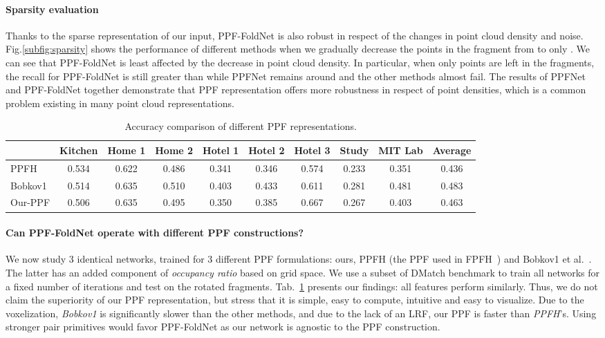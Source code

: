 \paragraph{Sparsity evaluation}
Thanks to the sparse representation of our input, PPF-FoldNet is also robust in respect of the changes in point cloud density and noise. Fig.\ref{subfig:sparsity} shows the performance of different methods when we gradually decrease the points in the fragment from  to only . We can see that PPF-FoldNet is least affected by the decrease in point cloud density. In particular, when only  points are left in the fragments, the recall for PPF-FoldNet is still greater than  while PPFNet remains around  and the other methods almost fail. The results of PPFNet and PPF-FoldNet together demonstrate that PPF representation offers more robustness in respect of point densities, which is a common problem existing in many point cloud representations.    
\begin{table}[t!]
  \centering
  \setlength{\tabcolsep}{3pt}
  \caption{Accuracy comparison of different PPF representations.}
    \begin{tabular}{lccccccccc}
          & \multicolumn{1}{l}{Kitchen} & \multicolumn{1}{l}{Home 1} & \multicolumn{1}{l}{Home 2} & \multicolumn{1}{l}{Hotel 1} & \multicolumn{1}{l}{Hotel 2} & \multicolumn{1}{l}{Hotel 3} & \multicolumn{1}{l}{Study} & \multicolumn{1}{l}{MIT Lab} & \multicolumn{1}{l}{Average} \\
    \midrule
    PPFH  & 0.534 & 0.622 & 0.486 & 0.341 & 0.346 & 0.574 & 0.233 & 0.351 & 0.436 \\
     Bobkov1     & 0.514 & 0.635 & 0.510 & 0.403 & 0.433 & 0.611 & 0.281 & 0.481 & 0.483 \\
    Our-PPF & 0.506 & 0.635 & 0.495 & 0.350 & 0.385 & 0.667 & 0.267 & 0.403 & 0.463 \\
    \end{tabular}\label{tab:ppf}\end{table}\paragraph{Can PPF-FoldNet operate with different PPF constructions?} We now study 3 identical networks, trained for 3 different PPF formulations: ours, PPFH (the PPF used in FPFH~\cite{fpfh}) and Bobkov1 et al.~\cite{bobkov2018noise}. The latter has an added component of \textit{occupancy ratio} based on grid space. We use a subset of DMatch benchmark to train all networks for a fixed number of iterations and test on the rotated fragments. Tab.~\ref{tab:ppf} presents our findings: all features perform similarly. Thus, we do not claim the superiority of our PPF representation, but stress that it is simple, easy to compute, intuitive and easy to visualize. Due to the voxelization, \textit{Bobkov1} is significantly slower than the other methods, and due to the lack of an LRF, our PPF is faster than \textit{PPFH}'s. Using stronger pair primitives would favor PPF-FoldNet as our network is agnostic to the PPF construction.

